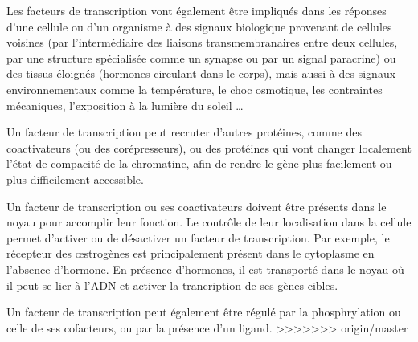 \documentclass{report}
\begin{document}
Les facteurs de transcription vont également être impliqués dans les réponses d'une cellule ou d'un organisme à des signaux biologique provenant de cellules voisines (par l'intermédiaire des liaisons transmembranaires entre deux cellules, par une structure spécialisée comme un synapse ou par un signal paracrine) ou des tissus éloignés (hormones circulant dans le corps), mais aussi à des signaux environnementaux comme la température, le choc osmotique, les contraintes mécaniques, l'exposition à la lumière du soleil  \dots


Un facteur de transcription peut recruter d'autres protéines, comme des coactivateurs (ou des corépresseurs), ou des protéines qui vont changer localement l'état de compacité de la chromatine, afin de rendre le gène plus facilement ou plus difficilement accessible. 

Un facteur de transcription ou ses coactivateurs doivent être présents dans le noyau pour accomplir leur fonction. Le contrôle de leur localisation dans la cellule permet d'activer ou de désactiver un facteur de transcription. Par exemple, le récepteur des \oe strogènes est principalement présent dans le cytoplasme en l'absence d'hormone. En présence d'hormones, il est transporté dans le noyau où il peut se lier à l'ADN et activer la trancription de ses gènes cibles. 


Un facteur de transcription peut également être régulé par la phosphrylation ou celle de ses cofacteurs, ou par la présence d'un ligand. 
>>>>>>> origin/master
\end{document}
